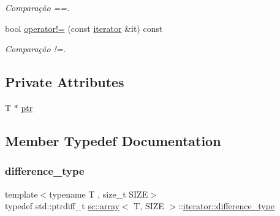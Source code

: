 \begin{DoxyCompactItemize}
\begin{DoxyCompactList}\small\item\em Comparação ==. \end{DoxyCompactList}\item 
bool \hyperlink{classsc_1_1array_1_1iterator_ac84816f86bbbe67a5a0951dba2668538}{operator!=} (const \hyperlink{classsc_1_1array_1_1iterator}{iterator} \&it) const
\begin{DoxyCompactList}\small\item\em Comparação !=. \end{DoxyCompactList}\end{DoxyCompactItemize}
\subsection*{Private Attributes}
\begin{DoxyCompactItemize}
\item 
T $\ast$ \hyperlink{classsc_1_1array_1_1iterator_a759319abf650f16d89547f520f7bb5a6}{ptr}
\end{DoxyCompactItemize}


\subsection{Member Typedef Documentation}
\mbox{\label{classsc_1_1array_1_1iterator_aee2e53646f6728620da44512ec0ea2d1}} 
\subsubsection{\texorpdfstring{difference\+\_\+type}{difference\_type}}
{\footnotesize\ttfamily template$<$typename T , size\+\_\+t S\+I\+ZE$>$ \\
typedef std\+::ptrdiff\+\_\+t \hyperlink{classsc_1_1array}{sc\+::array}$<$ T, S\+I\+ZE $>$\+::\hyperlink{classsc_1_1array_1_1iterator_aee2e53646f6728620da44512ec0ea2d1}{iterator\+::difference\+\_\+type}}

\mbox{\label{classsc_1_1array_1_1iterator_a75eb4a75d259d12310f3be4d16e8a7b9}} 

